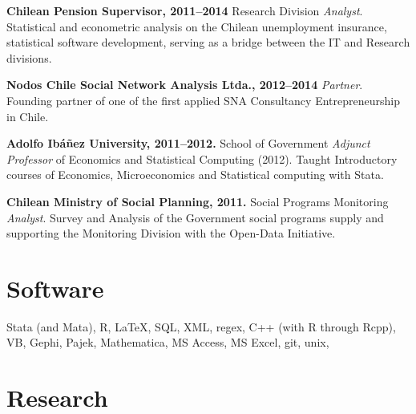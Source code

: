 \documentclass[letterpaper, 11pt]{article}
\renewenvironment{itemize}{
  \begin{list}{}{
    \setlength{\leftmargin}{0.45cm}
  }
}{
  \end{list}
}
\begin{document}
\begin{itemize}
\item \textbf{Chilean Pension Supervisor, 2011--2014} Research Division \emph{Analyst}. Statistical and econometric analysis on the Chilean unemployment insurance, statistical software development, serving as a bridge between the IT and Research divisions.
\item \textbf{Nodos Chile Social Network Analysis Ltda., 2012--2014} \emph{Partner}.
Founding partner of one of the first applied SNA Consultancy Entrepreneurship in Chile.
\item \textbf{Adolfo Ib\'a\~nez University, 2011--2012.} School of Government \emph{Adjunct Professor} of Economics and Statistical Computing (2012).
Taught Introductory courses of Economics, Microeconomics and Statistical computing with Stata.
\item \textbf{Chilean Ministry of Social Planning, 2011.} Social Programs Monitoring \emph{Analyst}.
Survey and Analysis of the Government social programs supply and supporting the Monitoring Division with the Open-Data Initiative.
\end{itemize}

\section*{Software}

\begin{itemize}
\item[] Stata (and Mata), R, \LaTeX, SQL, XML, regex, C++ (with R through Rcpp), VB, Gephi, Pajek, Mathematica, MS Access, MS Excel, git, unix,
\end{itemize}

\section*{Research}
\end{document}
